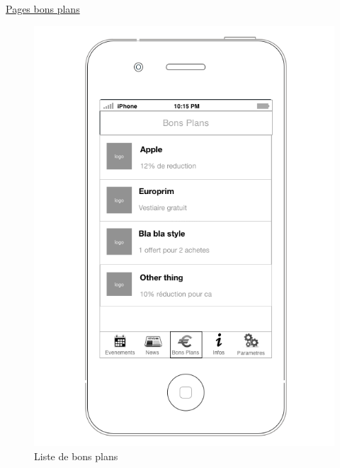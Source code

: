 \documentclass[a4paper, 11pt]{article}
\begin{document}
\underline{Pages bons plans}
\begin{figure}[h!]
	\begin{minipage}[c]{.50\linewidth}
		\begin{center}
			\includegraphics[scale=0.29]{../../Sketch/iOS/bons_plans_liste.png}
		\end{center}
	\caption{Liste de bons plans}


\end{minipage}
\end{figure}
\end{document}
